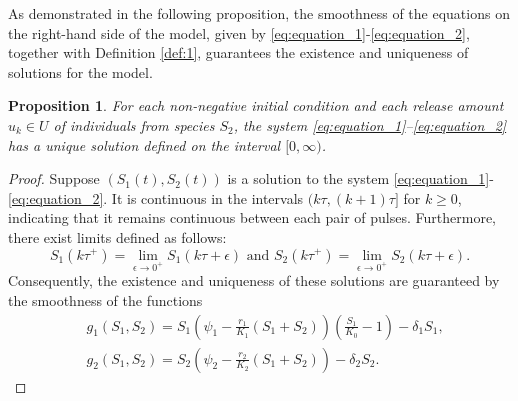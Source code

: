 \documentclass[10pt,letterpaper]{article}
\newtheorem{proposition}{Proposition}
\begin{document}
As demonstrated in the following proposition, the smoothness of the equations on the right-hand side of the model, given by \eqref{eq:equation_1}-\eqref{eq:equation_2}, together with Definition \eqref{def:1}, guarantees the existence and uniqueness of solutions for the model.

\begin{proposition}\label{prop:prop_2} For each non-negative initial condition and each release a\-mount  $u_k \in U$ of individuals from species $S_2$, the system \eqref{eq:equation_1}–\eqref{eq:equation_2} has a unique solution defined on the interval $[0, \infty)$.
\end{proposition}

\begin{proof}
Suppose $(S_1(t), S_2(t))$ is a solution to the system \eqref{eq:equation_1}-\eqref{eq:equation_2}. It is continuous in the intervals $(k\tau, (k+1)\tau]$ for $k \geq 0$, indicating that it remains continuous between each pair of pulses. Furthermore, there exist limits defined as follows:
\begin{equation}\label{eq:equation_13}
    S_1(k\tau^+) = \lim_{\epsilon \to 0^+} S_1(k\tau + \epsilon) \text{ and } S_2(k\tau^+) = \lim_{\epsilon \to 0^+} S_2(k\tau + \epsilon).
\end{equation}
Consequently, the existence and uniqueness of these solutions are guaranteed by the smoothness of the functions
\begin{align}\label{eq:equation_14}
    &g_1(S_1, S_2) = S_1\left(\psi_1 - \frac{r_1}{K_1}(S_1 + S_2)\right)\left(\frac{S_1}{K_0} - 1\right) - \delta_1 S_1,\\
    &g_2(S_1, S_2) = S_2\left(\psi_2 - \frac{r_2}{K_2}(S_1 + S_2)\right) - \delta_2 S_2.
\end{align}
\end{proof}
\end{document}
